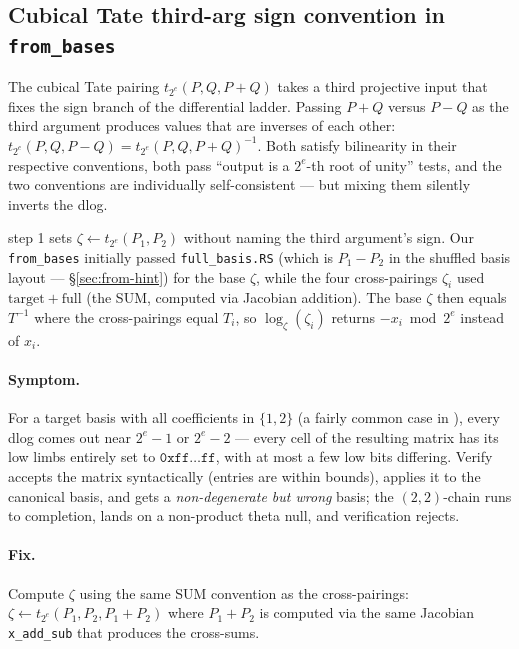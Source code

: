 \subsection{Cubical Tate third-arg sign convention in \texttt{from\_bases}}
\label{sec:tate-thirdarg-sign}

The cubical Tate pairing $t_{2^e}(P, Q, P {+} Q)$ takes a third
projective input that fixes the sign branch of the differential
ladder.  Passing $P {+} Q$ versus $P {-} Q$ as the third argument
produces values that are inverses of each other:
$t_{2^e}(P, Q, P {-} Q) = t_{2^e}(P, Q, P {+} Q)^{-1}$.  Both
satisfy bilinearity in their respective conventions, both pass
``output is a $2^e$-th root of unity'' tests, and the two
conventions are individually self-consistent — but mixing them
silently inverts the dlog.

 step 1 sets $\zeta \leftarrow t_{2^e}(P_1, P_2)$ without
naming the third argument's sign.  Our \texttt{from\_bases} initially
passed \texttt{full\_basis.RS} (which is $P_1 {-} P_2$ in the
shuffled basis layout — \S\ref{sec:from-hint}) for the base $\zeta$,
while the four cross-pairings $\zeta_i$ used $\mathrm{target} {+}
\mathrm{full}$ (the SUM, computed via Jacobian addition).  The base
$\zeta$ then equals $T^{-1}$ where the cross-pairings equal $T_i$,
so $\log_\zeta(\zeta_i)$ returns $-x_i \bmod 2^e$ instead of $x_i$.

\paragraph{Symptom.} For a target basis with all coefficients in
$\{1, 2\}$ (a fairly common case in ), every dlog comes
out near $2^e - 1$ or $2^e - 2$ — every cell of the resulting
matrix has its low limbs entirely set to $\mathtt{0xff\ldots ff}$,
with at most a few low bits differing.  Verify accepts the matrix
syntactically (entries are within bounds), applies it to the
canonical basis, and gets a \emph{non-degenerate but wrong} basis;
the $(2,2)$-chain runs to completion, lands on a non-product
theta null, and verification rejects.

\paragraph{Fix.}  Compute $\zeta$ using the same SUM convention as
the cross-pairings: $\zeta \leftarrow t_{2^e}(P_1, P_2, P_1 {+}
P_2)$ where $P_1 {+} P_2$ is computed via the same Jacobian
\texttt{x\_add\_sub} that produces the cross-sums.

